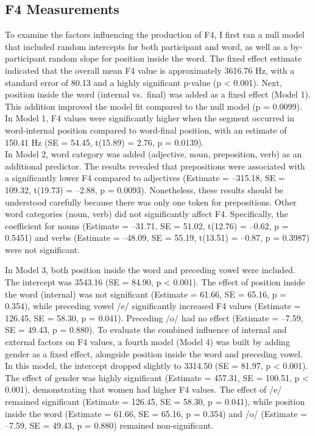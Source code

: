 \documentclass[
  man]{apa6}
\begin{document}
\subsection{F4 Measurements}\label{f4-measurements}

To examine the factors influencing the production of F4, I first ran a null model that included random intercepts for both participant and word, as well as a by-participant random slope for position inside the word. The fixed effect estimate indicated that the overall mean F4 value is approximately 3616.76 Hz, with a standard error of 80.13 and a highly significant p-value (p \textless{} 0.001).
Next, position inside the word (internal vs.~final) was added as a fixed effect (Model 1). This addition improved the model fit compared to the null model (p = 0.0099). In Model 1, F4 values were significantly higher when the segment occurred in word-internal position compared to word-final position, with an estimate of 150.41 Hz (SE = 54.45, t(15.89) = 2.76, p = 0.0139).\\
In Model 2, word category was added (adjective, noun, preposition, verb) as an additional predictor. The results revealed that prepositions were associated with a significantly lower F4 compared to adjectives (Estimate = --315.18, SE = 109.32, t(19.73) = --2.88, p = 0.0093). Nonetheless, these results should be understood carefully because there was only one token for prepositions. Other word categories (noun, verb) did not significantly affect F4. Specifically, the coefficient for nouns (Estimate = --31.71, SE = 51.02, t(12.76) = --0.62, p = 0.5451) and verbs (Estimate = --48.09, SE = 55.19, t(13.51) = --0.87, p = 0.3987) were not significant.

In Model 3, both position inside the word and preceding vowel were included. The intercept was 3543.16 (SE = 84.90, p \textless{} 0.001). The effect of position inside the word (internal) was not significant (Estimate = 61.66, SE = 65.16, p = 0.354), while preceding vowel /e/ significantly increased F4 values (Estimate = 126.45, SE = 58.30, p = 0.041). Preceding /o/ had no effect (Estimate = --7.59, SE = 49.43, p = 0.880).
To evaluate the combined influence of internal and external factors on F4 values, a fourth model (Model 4) was built by adding gender as a fixed effect, alongside position inside the word and preceding vowel. In this model, the intercept dropped slightly to 3314.50 (SE = 81.97, p \textless{} 0.001). The effect of gender was highly significant (Estimate = 457.31, SE = 100.51, p \textless{} 0.001), demonstrating that women had higher F4 values. The effect of /e/ remained significant (Estimate = 126.45, SE = 58.30, p = 0.041), while position inside the word (Estimate = 61.66, SE = 65.16, p = 0.354) and /o/ (Estimate = --7.59, SE = 49.43, p = 0.880) remained non-significant.
\end{document}
